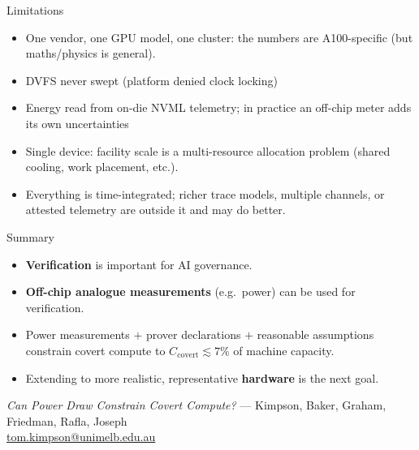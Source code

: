 \documentclass[aspectratio=169]{beamer}
\begin{document}
\begin{frame}{Limitations}
	\small
	\begin{itemize}\itemsep5pt
		\item One vendor, one GPU model, one cluster: the numbers are
		A100-specific (but maths/physics is general).
		\item DVFS never swept (platform denied clock locking)
		\item Energy read from on-die NVML telemetry; in practice an
		off-chip meter adds its own uncertainties
		\item Single device: facility scale is a multi-resource allocation
		problem (shared cooling, work placement, etc.).
		\item Everything is time-integrated;
		richer trace models, multiple channels, or attested telemetry are
		outside it and may do better.
	\end{itemize}
\end{frame}


\begin{frame}{Summary}
	\begin{itemize}\itemsep14pt
		\item \textbf{Verification} is important for AI governance.
		\item \textbf{Off-chip analogue measurements} (e.g.\ power) can be
		used for verification.
		\item Power measurements $+$ prover declarations $+$ reasonable
		assumptions constrain covert compute to
		$C_{\mathrm{covert}} \lesssim 7\%$ of machine capacity.
		\item Extending to more realistic, representative \textbf{hardware}
		is the next goal.
	\end{itemize}

	\vfill
	\centering
	{\footnotesize \emph{Can Power Draw Constrain Covert Compute?} ---
	Kimpson, Baker, Graham, Friedman, Rafla, Joseph\\
	\href{mailto:tom.kimpson@unimelb.edu.au}{tom.kimpson@unimelb.edu.au}}
\end{frame}
\end{document}
